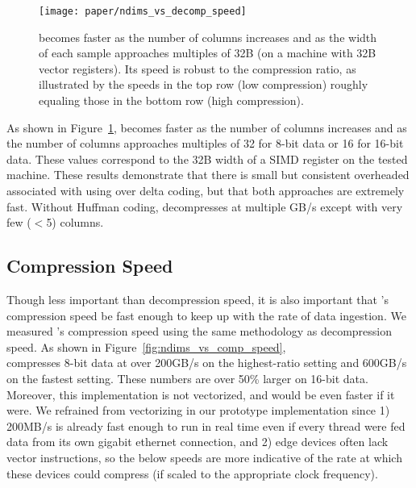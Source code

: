\begin{figure}[h]
\begin{center}
    \texttt{[image: paper/ndims\_vs\_decomp\_speed]}
    \caption{\minesp becomes faster as the number of columns increases and as the width of each sample approaches multiples of 32B (on a machine with 32B vector registers). Its speed is robust to the compression ratio, as illustrated by the speeds in the top row (low compression) roughly equaling those in the bottom row (high compression).}
    \label{fig:ndims_vs_decomp_speed}
\end{center}
\end{figure}

As shown in Figure~\ref{fig:ndims_vs_decomp_speed}, \minesp becomes faster as the number of columns increases and as the number of columns approaches multiples of 32 for 8-bit data or 16 for 16-bit data. These values correspond to the 32B width of a SIMD register on the tested machine. These results demonstrate that there is small but consistent overheaded associated with using \fire over delta coding, but that both approaches are extremely fast. Without Huffman coding, \minesp decompresses at multiple GB/s except with very few ($<$5) columns.

\subsection{Compression Speed} \label{sec:comp_speed}

Though less important than decompression speed, it is also important that \mine's compression speed be fast enough to keep up with the rate of data ingestion. We measured \mine's compression speed using the same methodology as decompression speed. As shown in Figure~\ref{fig:ndims_vs_comp_speed}, \minesp \\ compresses 8-bit data at over 200GB/s on the highest-ratio setting and 600GB/s on the fastest setting. These numbers are over 50\% larger on 16-bit data. Moreover, this implementation is not vectorized, and would be even faster if it were. We refrained from vectorizing in our prototype implementation since 1) 200MB/s is already fast enough to run in real time even if every thread were fed data from its own gigabit ethernet connection, and 2) edge devices often lack vector instructions, so the below speeds are more indicative of the rate at which these devices could compress (if scaled to the appropriate clock frequency).

